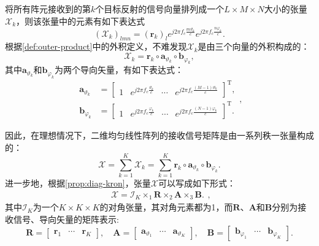 将所有阵元接收到的第\( k \)个目标反射的信号向量排列成一个\( L \times M \times N \)大小的张量\( \mathcal{X}_k \)，则该张量中的元素有如下表达式
\[
    \left( \mathcal{X}_k \right)_{lmn} = \left( \bm{r}_k \right)_l e^{j 2 \pi f_c \frac{m \vartheta_k}{c}} e^{j 2 \pi f_c \frac{n \varphi_k}{c}}.
\]
根据\cref{def:outer-product}中的外积定义，不难发现\( \mathcal{X}_k \)是由三个向量的外积构成的：
\[
    \mathcal{X}_k = \bm{r}_k \circ \bm{a}_{\vartheta_k} \circ \bm{b}_{\varphi_k},
\]
其中\( \bm{a}_{\vartheta_k} \)和\( \bm{b}_{\varphi_k} \)为两个导向矢量，有如下表达式：
\[
    \begin{split}
        \bm{a}_{\vartheta_k} & = \begin{bmatrix}
                                     1 & e^{j 2 \pi f_c \frac{\vartheta_k}{c}} & \cdots & e^{j 2 \pi f_c \frac{(M-1) \vartheta_k}{c}}
                                 \end{bmatrix}^{\mathrm{T}}, \\
        \bm{b}_{\varphi_k}   & = \begin{bmatrix}
                                     1 & e^{j 2 \pi f_c \frac{\varphi_k}{c}} & \cdots & e^{j 2 \pi f_c \frac{(N-1) \varphi_k}{c}}
                                 \end{bmatrix}^{\mathrm{T}}.
    \end{split},
\]

因此，在理想情况下，二维均匀线性阵列的接收信号矩阵是由一系列秩一张量构成的：
\[
    \mathcal{X}
    = \sum_{k=1}^{K} \mathcal{X}_k
    = \sum_{k=1}^{K} \bm{r}_k \circ \bm{a}_{\vartheta_k} \circ \bm{b}_{\varphi_k}.
\]
进一步地，根据\cref{prop:diag-kron}，张量\( \mathcal{X} \)可以写成如下形式：
\[
    \begin{split}
        \mathcal{X} = \mathcal{I}_K \times_1 \mathbf{R} \times_2 \mathbf{A} \times_3 \mathbf{B}.
    \end{split},
\]
其中\( \mathcal{I}_K \)为一个\( K \times K \times K \)的对角张量，其对角元素都为1，而\( \mathbf{R} \)、\( \mathbf{A} \)和\( \mathbf{B} \)分别为接收信号、导向矢量的矩阵表示:
\[
    \mathbf{R} = \begin{bmatrix}
        \bm{r}_1 & \cdots & \bm{r}_K
    \end{bmatrix}, \quad
    \mathbf{A} = \begin{bmatrix}
        \bm{a}_{\vartheta_1} & \cdots & \bm{a}_{\vartheta_K}
    \end{bmatrix}, \quad
    \mathbf{B} = \begin{bmatrix}
        \bm{b}_{\varphi_1} & \cdots & \bm{b}_{\varphi_K}
    \end{bmatrix}.
\]

